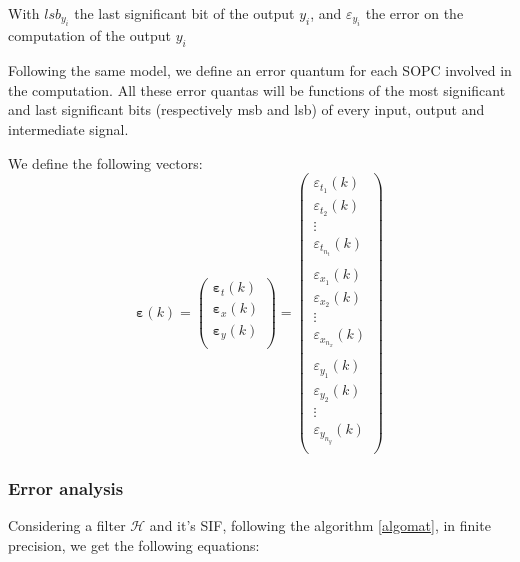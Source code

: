 	With $lsb_{y_i}$ the last significant bit of the output $y_i$, and $\varepsilon_{y_i}$ the error on the computation of the output $y_i$

	Following the same model, we define an error quantum for each SOPC involved in the computation.
	All these error quantas will be functions of the most significant and last significant bits (respectively msb and lsb) of every input, output and intermediate signal.

	We define the following vectors:
	\begin{equation}
		\boldsymbol{\varepsilon}(k) =
		\begin{pmatrix}
			\boldsymbol{\varepsilon}_t(k) \\
			\boldsymbol{\varepsilon}_x(k) \\
			\boldsymbol{\varepsilon}_y(k) \\
		\end{pmatrix}
		=
		\begin{pmatrix}
			{\varepsilon}_{t_1}(k) \\
			{\varepsilon}_{t_2}(k) \\
			\vdots \\
			{\varepsilon}_{t_{n_t}}(k) \\
			\hspace{5pt} \\
			{\varepsilon}_{x_1}(k) \\
			{\varepsilon}_{x_2}(k) \\
			\vdots \\
			{\varepsilon}_{x_{n_x}}(k) \\
			\hspace{5pt} \\
			{\varepsilon}_{y_1}(k) \\
			{\varepsilon}_{y_2}(k) \\
			\vdots \\
			{\varepsilon}_{y_{n_y}}(k) \\
		\end{pmatrix}
	\end{equation}


		
	\subsubsection{Error analysis}

	Considering a filter $\mathcal{H}$ and it’s SIF, following
	the algorithm \ref{algomat}, in finite precision, we get the following equations:

